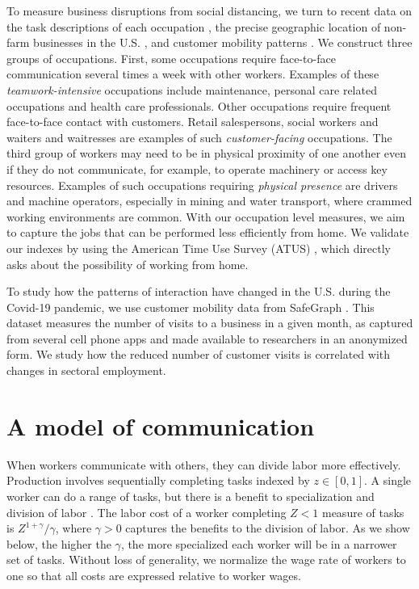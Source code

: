 To measure business disruptions from social distancing, we turn to recent data on the task descriptions of each occupation \cite{National_Center_for_ONET_Development2020-wj}, the precise geographic location of non-farm businesses in the U.S. \cite{CBP}, and customer mobility patterns \cite{SafeGraph2020-gn}. We construct three groups of occupations. First, some occupations require face-to-face communication several times a week with other workers. Examples of these \emph{teamwork-intensive} occupations include maintenance, personal care related occupations and health care professionals. Other occupations require frequent face-to-face contact with customers. Retail salespersons, social workers and waiters and waitresses are examples of such \emph{customer-facing} occupations. The third group of workers may need to be in physical proximity of one another even if they do not communicate, for example, to operate machinery or access key resources. Examples of such occupations requiring \emph{physical presence} are drivers and machine operators, especially in mining and water transport, where crammed working environments are common. With our occupation level measures, we aim to capture the jobs that can be performed less efficiently from home. We validate our indexes by using the American Time Use Survey (ATUS) \cite{ATUS}, which directly asks about the possibility of working from home.  

To study how the patterns of interaction have changed in the U.S. during the Covid-19 pandemic, we use customer mobility data from SafeGraph \cite{SafeGraph2020-gn}. This dataset measures the number of visits to a business in a given month, as captured from several cell phone apps and made available to researchers in an anonymized form. We study how the reduced number of customer visits is correlated with changes in sectoral employment.

\section*{A model of communication}
When workers communicate with others, they can divide labor more effectively. Production involves sequentially completing tasks indexed by $z\in[0,1]$. A single worker can do a range of tasks, but there is a benefit to specialization and division of labor \cite{Smith1778-qq,Becker1992-ac}. The labor cost of a worker completing $Z<1$ measure of tasks is $Z^{1+\gamma}/\gamma$, where $\gamma>0$ captures the benefits to the division of labor. As we show below, the higher the $\gamma$, the more specialized each worker will be in a narrower set of tasks. Without loss of generality, we normalize the wage rate of workers to one so that all costs are expressed relative to worker wages.

